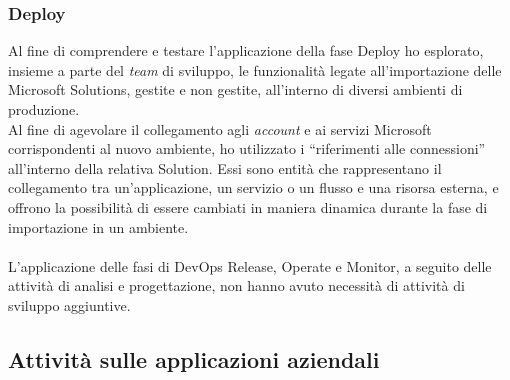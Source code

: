 \subsubsection*{Deploy}
Al fine di comprendere e testare l'applicazione della fase Deploy ho esplorato, insieme a parte del \emph{team} di sviluppo, le funzionalità legate all'importazione delle Microsoft Solutions, gestite e non gestite, all'interno di diversi ambienti di produzione.\\ 
Al fine di agevolare il collegamento agli \emph{account} e ai servizi Microsoft corrispondenti al nuovo ambiente, ho utilizzato i “riferimenti alle connessioni” all'interno della relativa Solution.
Essi sono entità che rappresentano il collegamento tra un'applicazione, un servizio o un flusso e una risorsa esterna, e offrono la possibilità di essere cambiati in maniera dinamica durante la fase di importazione in un ambiente.\\\\
L'applicazione delle fasi di \gls{DevOps} Release, Operate e Monitor, a seguito delle attività di analisi e progettazione, non hanno avuto necessità di attività di sviluppo aggiuntive. 

\subsection{Attività sulle applicazioni aziendali}
\label{sviluppoApplicazioni}

